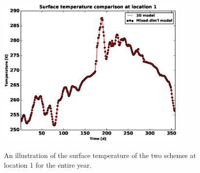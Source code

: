 \documentclass[review]{elsarticle}
\begin{document}
\begin{figure}[!htpb]
\centering
\includegraphics[height = 7.5cm, width=11.cm]{figures/comparison/regular/surf-temp/comp-temp-location1.eps} \\
\caption{An illustration of the surface temperature of the two schemes at location 1 for the entire year. %
}
\label{surf-temp-comp}
\end{figure}

\end{document}
